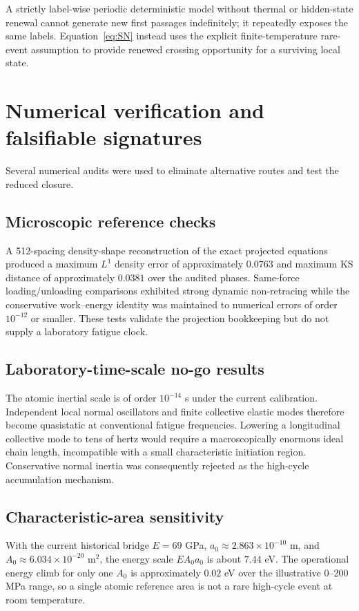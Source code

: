 \documentclass[11pt]{article}
\begin{document}
A strictly label-wise periodic deterministic model without thermal or hidden-state renewal cannot generate new first passages indefinitely; it repeatedly exposes the same labels. Equation~\eqref{eq:SN} instead uses the explicit finite-temperature rare-event assumption to provide renewed crossing opportunity for a surviving local state.

\section{Numerical verification and falsifiable signatures}
Several numerical audits were used to eliminate alternative routes and test the reduced closure.

\subsection{Microscopic reference checks}
A 512-spacing density-shape reconstruction of the exact projected equations produced a maximum $L^1$ density error of approximately $0.0763$ and maximum KS distance of approximately $0.0381$ over the audited phases. Same-force loading/unloading comparisons exhibited strong dynamic non-retracing while the conservative work--energy identity was maintained to numerical errors of order $10^{-12}$ or smaller. These tests validate the projection bookkeeping but do not supply a laboratory fatigue clock.

\subsection{Laboratory-time-scale no-go results}
The atomic inertial scale is of order $10^{-14}$ s under the current calibration. Independent local normal oscillators and finite collective elastic modes therefore become quasistatic at conventional fatigue frequencies. Lowering a longitudinal collective mode to tens of hertz would require a macroscopically enormous ideal chain length, incompatible with a small characteristic initiation region. Conservative normal inertia was consequently rejected as the high-cycle accumulation mechanism.

\subsection{Characteristic-area sensitivity}
With the current historical bridge $E=69$ GPa, $a_0\approx2.863\times10^{-10}$ m, and $A_0\approx6.034\times10^{-20}$ m$^2$, the energy scale $EA_0a_0$ is about $7.44$ eV. The operational energy climb for only one $A_0$ is approximately $0.02$ eV over the illustrative 0--200 MPa range, so a single atomic reference area is not a rare high-cycle event at room temperature.
\end{document}
